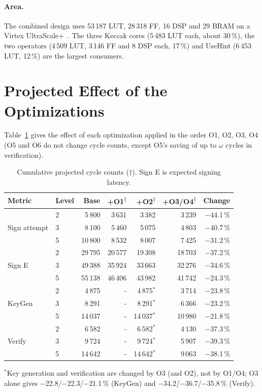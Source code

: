 \documentclass[12pt,a4paper]{report}
\newcommand{\est}{\textsuperscript{$\dagger$}}
\begin{document}
\paragraph{Area.}
The combined design uses 53\,187 LUT, 28\,318 FF, 16 DSP and 29 BRAM on a Virtex UltraScale+~\cite{beckwith2022}. The three Keccak cores (5\,483 LUT each, about 30\,\%), the two operators (4\,509 LUT, 3\,146 FF and 8 DSP each, 17\,\%) and UseHint (6\,453 LUT, 12\,\%) are the largest consumers.

\section{Projected Effect of the Optimizations}
Table~\ref{tab:opts} gives the effect of each optimization applied in the order O1, O2, O3, O4 (O5 and O6 do not change cycle counts, except O5's saving of up to $\omega$ cycles in verification).

\begin{table}[H]
\centering
\caption{Cumulative projected cycle counts ($\dagger$). Sign E is expected signing latency.}\label{tab:opts}
\begin{tabular}{@{}llrrrrr@{}}
\toprule
Metric & Level & Base & +O1\est & +O2\est & +O3/O4\est & Change\\
\midrule
\multirow{3}{*}{Sign attempt}
 & 2 &  5\,800 &  3\,631 &  3\,382 &  3\,239 & $-$44.1\,\%\\
 & 3 &  8\,100 &  5\,460 &  5\,075 &  4\,803 & $-$40.7\,\%\\
 & 5 & 10\,800 &  8\,532 &  8\,007 &  7\,425 & $-$31.2\,\%\\
\midrule
\multirow{3}{*}{Sign E}
 & 2 & 29\,795 & 20\,577 & 19\,308 & 18\,703 & $-$37.2\,\%\\
 & 3 & 49\,388 & 35\,924 & 33\,663 & 32\,276 & $-$34.6\,\%\\
 & 5 & 55\,138 & 46\,406 & 43\,982 & 41\,742 & $-$24.3\,\%\\
\midrule
\multirow{3}{*}{KeyGen}
 & 2 &  4\,875 &  - &  4\,875$^\ast$ &  3\,714 & $-$23.8\,\%\\
 & 3 &  8\,291 &  - &  8\,291$^\ast$ &  6\,366 & $-$23.2\,\%\\
 & 5 & 14\,037 &  - & 14\,037$^\ast$ & 10\,980 & $-$21.8\,\%\\
\midrule
\multirow{3}{*}{Verify}
 & 2 &  6\,582 &  - &  6\,582$^\ast$ &  4\,130 & $-$37.3\,\%\\
 & 3 &  9\,724 &  - &  9\,724$^\ast$ &  5\,907 & $-$39.3\,\%\\
 & 5 & 14\,642 &  - & 14\,642$^\ast$ &  9\,063 & $-$38.1\,\%\\
\bottomrule
\end{tabular}

\smallskip
\footnotesize $^\ast$Key generation and verification are changed by O3 (and O2), not by O1/O4; O3 alone gives $-$22.8/$-$22.3/$-$21.1\,\% (KeyGen) and $-$34.2/$-$36.7/$-$35.8\,\% (Verify).
\end{table}
\end{document}
